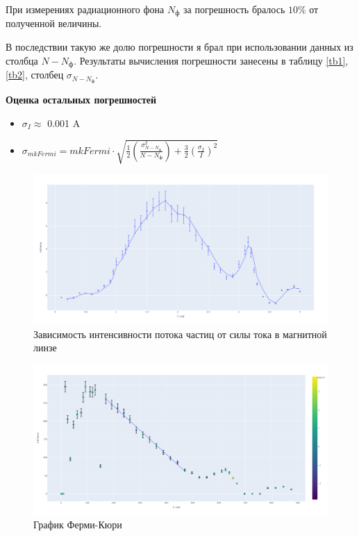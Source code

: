 \documentclass[15pt,a5paper,reqno]{article}
\begin{document}
\begin{enumerate}
При измерениях радиационного фона $N_ф$ за погрешность бралось $10 \%$ от полученной величины.

В последствии такую же долю погрешности я брал при использовании данных из столбца $N - N_ф$. Результаты вычисления погрешности занесены в таблицу \ref{tb1}, \ref{tb2}, столбец $\sigma_{N - N_ф}$.

\textbf{Оценка остальных погрешностей}

\begin{itemize}
	\item $\sigma_{I} \approx$ 0.001 A
	\item $\sigma_{mkFermi} = mkFermi \cdot \sqrt{\frac{1}{2}\left(\frac{\sigma_{N - N_ф}^{2}}{N - N_ф} \right) + \frac{3}{2}\left(\frac{\sigma_{I}}{I}\right)^{2}} $
\end{itemize}

\begin{figure}[h!]
			\centering
			\includegraphics[width=\linewidth]{pics/lab_5_4_2_1.png}
			\caption{Зависимость интенсивности потока частиц от силы тока в магнитной линзе}
		\end{figure}
		
\begin{figure}[h!]
			\centering
			\includegraphics[width=\linewidth]{pics/lab_5_4_2_2.png}
			\caption{График Ферми-Кюри}
		\end{figure}
		
\end{enumerate}
\end{document}
